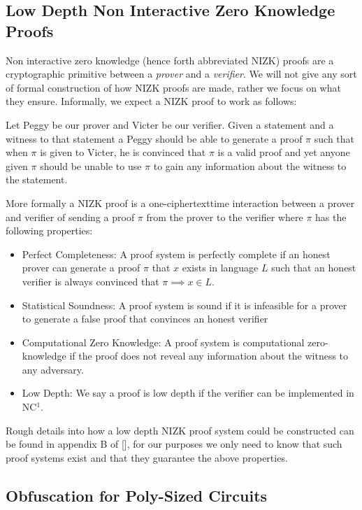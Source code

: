 \documentclass[12pt,twoside]{reedthesis}
\begin{document}
       \subsection{Low Depth Non Interactive Zero Knowledge Proofs}
       
       Non interactive zero knowledge (hence forth abbreviated NIZK) proofs are a cryptographic primitive between a \textit{prover} and a \textit{verifier}. We will not give any sort of formal construction of how NIZK proofs are made, rather we focus on what they ensure. Informally, we expect a NIZK proof to work as follows:
       \par Let Peggy be our prover and Victer be our verifier. Given a statement and a witness to that statement a Peggy should be able to generate a proof $\pi$ such that when $\pi$ is given to Victer, he is convinced that $\pi$ is a valid proof and yet anyone given $\pi$ should be unable to use $\pi$ to gain any information about the witness to the statement.
       \par More formally a NIZK proof is a one-ciphertexttime interaction between a prover and verifier of sending a proof $\pi$ from the prover to the verifier where $\pi$ has the following properties:
       \begin{itemize}
       \item Perfect Completeness: A proof system is perfectly complete if an honest prover can generate a proof $\pi$ that $x$ exists in language $L$ such that an honest verifier is always convinced that $\pi \implies x\in L$.
       \item Statistical Soundness: A proof system is sound if it is infeasible for a prover to generate a false proof that convinces an honest verifier
       \item Computational Zero Knowledge: A proof system is computational zero-knowledge if the proof does not reveal any information about the witness to any adversary.
       \item Low Depth: We say a proof is low depth if the verifier can be implemented in NC$^1$.
         \end{itemize}
    
    
    \par Rough details into how a low depth NIZK proof system could be constructed can be found in appendix B of [\cite{Garg:2013}], for our purposes we only need to know that such proof systems exist and that they guarantee the above properties.
    
    \subsection{Obfuscation for Poly-Sized Circuits}
    
\end{document}
